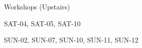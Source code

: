 \documentclass{article}
\newcommand{\room}[1]{
    \noindent
    #1
    \vspace{.2in}

}
\begin{document}
\rssheader[2in]

\vfill

\begin{center}
    \rsshuge
    \room{Workshops (Upstairs)}
    \rsstiny
    \room{SAT-04, SAT-05, SAT-10}
    \room{SUN-02, SUN-07, SUN-10, SUN-11, SUN-12}
\end{center}

\rssarrowright

\vfill
\end{document}
